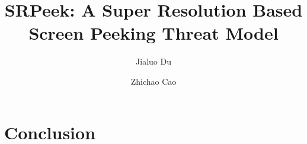 \documentclass[sigconf]{acmart}
\begin{document}
\title{SRPeek: A Super Resolution Based Screen Peeking Threat Model}

\author{Jialuo Du}

\author{Zhichao Cao}




\maketitle













\section{Conclusion}
\label{sec-conclusion}





\end{document}
